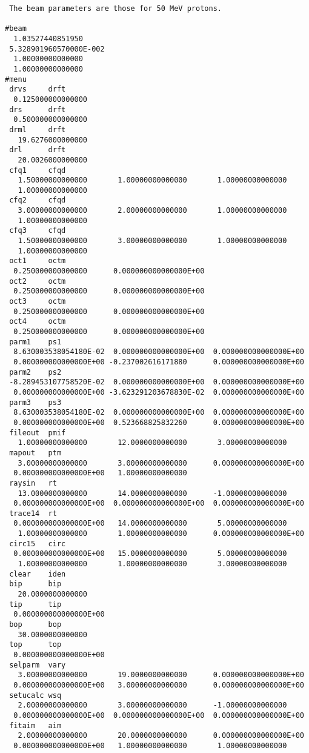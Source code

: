 \begin{footnotesize}
\begin{verbatim}
 The beam parameters are those for 50 MeV protons.

#beam
  1.03527440851950
 5.328901960570000E-002
  1.00000000000000
  1.00000000000000
#menu
 drvs     drft
  0.125000000000000
 drs      drft
  0.500000000000000
 drml     drft
   19.6276000000000
 drl      drft
   20.0026000000000
 cfq1     cfqd
   1.50000000000000       1.00000000000000       1.00000000000000
   1.00000000000000
 cfq2     cfqd
   3.00000000000000       2.00000000000000       1.00000000000000
   1.00000000000000
 cfq3     cfqd
   1.50000000000000       3.00000000000000       1.00000000000000
   1.00000000000000
 oct1     octm
  0.250000000000000      0.000000000000000E+00
 oct2     octm
  0.250000000000000      0.000000000000000E+00
 oct3     octm
  0.250000000000000      0.000000000000000E+00
 oct4     octm
  0.250000000000000      0.000000000000000E+00
 parm1    ps1
  8.630003538054180E-02  0.000000000000000E+00  0.000000000000000E+00
  0.000000000000000E+00 -0.237002616171880      0.000000000000000E+00
 parm2    ps2
 -8.289453107758520E-02  0.000000000000000E+00  0.000000000000000E+00
  0.000000000000000E+00 -3.623291203678830E-02  0.000000000000000E+00
 parm3    ps3
  8.630003538054180E-02  0.000000000000000E+00  0.000000000000000E+00
  0.000000000000000E+00  0.523668825832260      0.000000000000000E+00
 fileout  pmif
   1.00000000000000       12.0000000000000       3.00000000000000
 mapout   ptm
   3.00000000000000       3.00000000000000      0.000000000000000E+00
  0.000000000000000E+00   1.00000000000000
 raysin   rt
   13.0000000000000       14.0000000000000      -1.00000000000000
  0.000000000000000E+00  0.000000000000000E+00  0.000000000000000E+00
 trace14  rt
  0.000000000000000E+00   14.0000000000000       5.00000000000000
   1.00000000000000       1.00000000000000      0.000000000000000E+00
 circ15   circ
  0.000000000000000E+00   15.0000000000000       5.00000000000000
   1.00000000000000       1.00000000000000       3.00000000000000
 clear    iden
 bip      bip
   20.0000000000000
 tip      tip
  0.000000000000000E+00
 bop      bop
   30.0000000000000
 top      top
  0.000000000000000E+00
 selparm  vary
   3.00000000000000       19.0000000000000      0.000000000000000E+00
  0.000000000000000E+00   3.00000000000000      0.000000000000000E+00
 setucalc wsq
   2.00000000000000       3.00000000000000      -1.00000000000000
  0.000000000000000E+00  0.000000000000000E+00  0.000000000000000E+00
 fitaim   aim
   2.00000000000000       20.0000000000000      0.000000000000000E+00
  0.000000000000000E+00   1.00000000000000       1.00000000000000

\end{verbatim}
\end{footnotesize}
